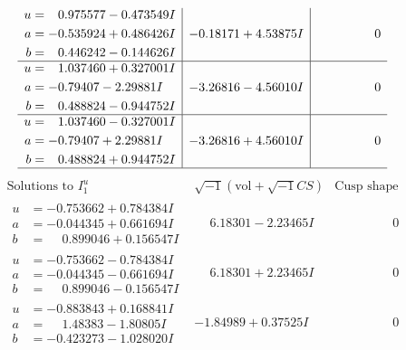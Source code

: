 \documentclass[1p]{elsarticle_modified}
\theoremstyle{definition}
\newcommand{\I}{\sqrt{-1}}
\begin{document}
$$\begin{array}{c|c|c}
\begin{aligned}
u &= \phantom{-}0.975577 - 0.473549 I \\
a &= -0.535924 + 0.486426 I \\
b &= \phantom{-}0.446242 - 0.144626 I\end{aligned}
 & -0.18171 + 4.53875 I & \phantom{-0.000000 } 0 \\ \hline\begin{aligned}
u &= \phantom{-}1.037460 + 0.327001 I \\
a &= -0.79407 - 2.29881 I \\
b &= \phantom{-}0.488824 - 0.944752 I\end{aligned}
 & -3.26816 - 4.56010 I & \phantom{-0.000000 } 0 \\ \hline\begin{aligned}
u &= \phantom{-}1.037460 - 0.327001 I \\
a &= -0.79407 + 2.29881 I \\
b &= \phantom{-}0.488824 + 0.944752 I\end{aligned}
 & -3.26816 + 4.56010 I & \phantom{-0.000000 } 0\\
 \hline 
 \end{array}$$\newpage$$\begin{array}{c|c|c}  
\text{Solutions to }I^u_{1}& \I (\text{vol} + \sqrt{-1}CS) & \text{Cusp shape}\\
 \hline 
\begin{aligned}
u &= -0.753662 + 0.784384 I \\
a &= -0.044345 + 0.661694 I \\
b &= \phantom{-}0.899046 + 0.156547 I\end{aligned}
 & \phantom{-}6.18301 - 2.23465 I & \phantom{-0.000000 } 0 \\ \hline\begin{aligned}
u &= -0.753662 - 0.784384 I \\
a &= -0.044345 - 0.661694 I \\
b &= \phantom{-}0.899046 - 0.156547 I\end{aligned}
 & \phantom{-}6.18301 + 2.23465 I & \phantom{-0.000000 } 0 \\ \hline\begin{aligned}
u &= -0.883843 + 0.168841 I \\
a &= \phantom{-}1.48383 - 1.80805 I \\
b &= -0.423273 - 1.028020 I\end{aligned}
 & -1.84989 + 0.37525 I & \phantom{-0.000000 } 0 \\ \hline\begin{aligned}

\end{aligned}
\end{array}$$
\end{document}
